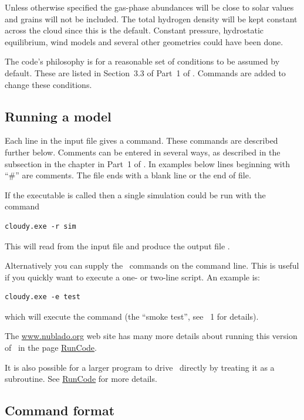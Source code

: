 \documentclass[12pt,twoside]{article}
\begin{document}
{Unless otherwise specified the gas-phase abundances will
be close to solar values and grains will not be included.
The total hydrogen density will be kept constant across the cloud
since this is the default.
Constant pressure, hydrostatic equilibrium, wind models
and several other geometries could have been done.

The code's philosophy is for a reasonable set of conditions to be assumed
by default.
These are listed in Section~3.3 of Part~1 of \Hazy.
Commands are added to change these conditions.

\subsection{Running a model}

Each line in the input file gives a command.
These commands are described further below.
Comments can be entered in several ways, as described in
the subsection  in the
chapter  in
Part~1 of \Hazy.
In examples below lines beginning with ``\#'' are comments.
The file ends with a blank line or the end of file.

If the executable is called 
then a single simulation could be run with the command
\small
\begin{verbatim}
cloudy.exe -r sim
\end{verbatim}
\normalsize
This will read from the input file  and 
produce the output file . 

Alternatively you can supply the \Cloudy\ commands on the command line. This
is useful if you quickly want to execute a one- or two-line script. An example is:
\small
\begin{verbatim}
cloudy.exe -e test
\end{verbatim}
\normalsize
which will execute the command  (the ``smoke test'', see \Hazy~1
for details).

The \href{http://www.nublado.org}{www.nublado.org} web site has many more details
about running this version of \Cloudy\ in the page
\href{https://gitlab.nublado.org/cloudy/cloudy/-/wikis/RunCode}{RunCode}.

It is also possible for a larger program to drive \Cloudy\ directly by
treating it as a subroutine. 
See \href{https://gitlab.nublado.org/cloudy/cloudy/-/wikis/RunCode}{RunCode}
for more details.

\subsection{Command format}

}
\end{document}
